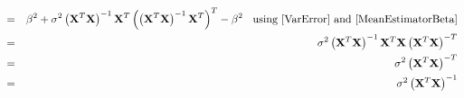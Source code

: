 \documentclass[11pt]{article}
\theoremstyle{remark}
\begin{document}
\begin{eqnarray}
&=& \beta^2 + \sigma^2 \left(\bold{X}^T\bold{X}\right)^{-1}\bold{X}^T\left(\left(\bold{X}^T\bold{X}\right)^{-1}\bold{X}^T\right)^T - \beta^2\:\:\:\:\text{using \eqref{VarError} and \eqref{MeanEstimatorBeta}}\nonumber\\
&=& \sigma^2 \left(\bold{X}^T\bold{X}\right)^{-1}\bold{X}^T\bold{X}\left(\bold{X}^T\bold{X}\right)^{-T}\nonumber\\
&=& \sigma^2 \left(\bold{X}^T\bold{X}\right)^{-T}\nonumber\\
&=& \sigma^2 \left(\bold{X}^T\bold{X}\right)^{-1}\label{VarEstimator}
\end{eqnarray}



\end{document}
